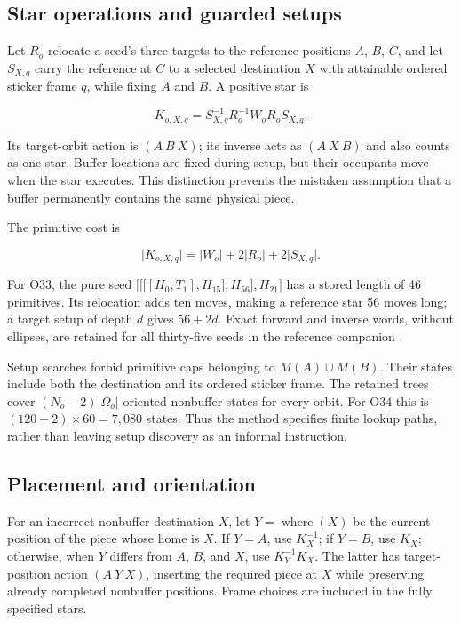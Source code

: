 \documentclass[a4paper,11pt]{article}
\begin{document}
\subsection{Star operations and guarded setups}

Let \(R_{o}\) relocate a seed's three targets to the reference positions \(A\), \(B\), \(C\), and let \(S_{X,q}\) carry the reference at \(C\) to a selected destination \(X\) with attainable ordered sticker frame \(q\), while fixing \(A\) and \(B\). A positive star is

\begin{equation}
K_{o,X,q}=S_{X,q}^{-1}R_o^{-1}W_oR_oS_{X,q}.
\label{eq:star}
\end{equation}

Its target-orbit action is \((A\ B\ X)\); its inverse acts as \((A\ X\ B)\) and also counts as one star. Buffer locations are fixed during setup, but their occupants move when the star executes. This distinction prevents the mistaken assumption that a buffer permanently contains the same physical piece.

The primitive cost is

\begin{equation}
\lvert K_{o,X,q}\rvert=\lvert W_o\rvert+2\lvert R_o\rvert+2\lvert S_{X,q}\rvert.
\label{eq:star-cost}
\end{equation}

For O33, the pure seed \(\bigl[\bigl[\bigl[[H_0,T_1],H_{15}\bigr],H_{56}\bigr],H_{21}\bigr]\) has a stored length of 46 primitives. Its relocation adds ten moves, making a reference star 56 moves long; a target setup of depth \(d\) gives \(56+2d\). Exact forward and inverse words, without ellipses, are retained for all thirty-five seeds in the reference companion \cite{algorithms}.

Setup searches forbid primitive caps belonging to \(M(A)\cup M(B)\). Their states include both the destination and its ordered sticker frame. The retained trees cover \((N_o-2)\lvert\Omega_o\rvert\) oriented nonbuffer states for every orbit. For O34 this is \((120-2)\times60=7{,}080\) states. Thus the method specifies finite lookup paths, rather than leaving setup discovery as an informal instruction.

\subsection{Placement and orientation}

For an incorrect nonbuffer destination \(X\), let \(Y=\operatorname{where}(X)\) be the current position of the piece whose home is \(X\). If \(Y=A\), use \(K_{X}^{-1}\); if \(Y=B\), use \(K_{X}\); otherwise, when \(Y\) differs from \(A\), \(B\), and \(X\), use \(K_Y^{-1}K_X\). The latter has target-position action \((A\ Y\ X)\), inserting the required piece at \(X\) while preserving already completed nonbuffer positions. Frame choices are included in the fully specified stars.
\end{document}
